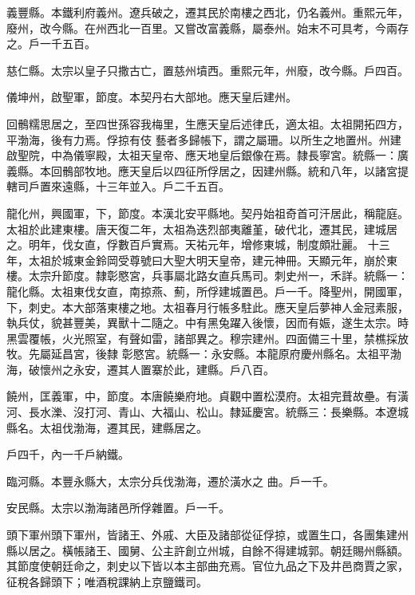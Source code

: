 \begin{pinyinscope}
 義豐縣。本鐵利府義州。遼兵破之，遷其民於南樓之西北，仍名義州。重熙元年，廢州，改今縣。在州西北一百里。又嘗改富義縣，屬泰州。始末不可具考，今兩存之。戶一千五百。



 慈仁縣。太宗以皇子只撒古亡，置慈州墳西。重熙元年，州廢，改今縣。戶四百。



 儀坤州，啟聖軍，節度。本契丹右大部地。應天皇后建州。



 回鶻糯思居之，至四世孫容我梅里，生應天皇后述律氏，適太祖。太祖開拓四方，平渤海，後有力焉。俘掠有伎
 藝者多歸帳下，謂之屬珊。以所生之地置州。州建啟聖院，中為儀寧殿，太祖天皇帝、應天地皇后銀像在焉。隸長寧宮。統縣一：廣義縣。本回鶻部牧地。應天皇后以四征所俘居之，因建州縣。統和八年，以諸宮提轄司戶置來遠縣，十三年並入。戶二千五百。



 龍化州，興國軍，下，節度。本漢北安平縣地。契丹始祖奇首可汗居此，稱龍庭。太祖於此建東樓。唐天復二年，太祖為迭烈部夷離堇，破代北，遷其民，建城居之。明年，伐女直，俘數百戶實焉。天祐元年，增修東城，制度頗壯麗。
 十三年，太祖於城東金鈴岡受尊號曰大聖大明天皇帝，建元神冊。天顯元年，崩於東樓。太宗升節度。隸彰愍宮，兵事屬北路女直兵馬司。刺史州一，禾詳。統縣一：龍化縣。太祖東伐女直，南掠燕、薊，所俘建城置邑。戶一千。降聖州，開國軍，下，刺史。本大部落東樓之地。太祖春月行帳多駐此。應天皇后夢神人金冠素服，執兵仗，貌甚豐美，異獸十二隨之。中有黑兔躍入後懷，因而有娠，遂生太宗。時黑雲覆帳，火光照室，有聲如雷，諸部異之。穆宗建州。四面備三十里，禁樵採放牧。先屬延昌宮，後隸
 彰愍宮。統縣一：永安縣。本龍原府慶州縣名。太祖平渤海，破懷州之永安，遷其人置寨於此，建縣。戶八百。



 饒州，匡義軍，中，節度。本唐饒樂府地。貞觀中置松漠府。太祖完葺故壘。有潢河、長水濼、沒打河、青山、大福山、松山。隸延慶宮。統縣三：長樂縣。本遼城縣名。太祖伐渤海，遷其民，建縣居之。



 戶四千，內一千戶納鐵。



 臨河縣。本豐永縣大，太宗分兵伐渤海，遷於潢水之
 曲。戶一千。



 安民縣。太宗以渤海諸邑所俘雜置。戶一千。



 頭下軍州頭下軍州，皆諸王、外戚、大臣及諸部從征俘掠，或置生口，各團集建州縣以居之。橫帳諸王、國舅、公主許創立州城，自餘不得建城郭。朝廷賜州縣額。其節度使朝廷命之，刺史以下皆以本主部曲充焉。官位九品之下及井邑商賈之家，征稅各歸頭下；唯酒稅課納上京鹽鐵司。




\end{pinyinscope}
